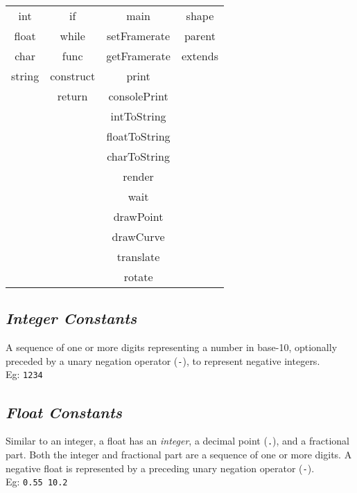         \begin{center}
            \begin{tabular}{ |c|c|c|c| } 
            \hline
                int     & if            & main          & shape   \\ 
                float   & while         & setFramerate  & parent  \\ 
                char    & func          & getFramerate  & extends \\
                string  & construct     & print         & \\
                        & return        & consolePrint  & \\
                        &               & intToString   & \\
                        &               & floatToString & \\
                        &               & charToString  & \\
                        &               & render        & \\
                        &               & wait          & \\
                        &               & drawPoint     & \\
                        &               & drawCurve     & \\
                        &               & translate     & \\
                        &               & rotate        & \\

            \hline
            \end{tabular}
        \end{center}

    \subsection{\textit{Integer Constants}}
    A sequence of one or more digits representing a number in base-10, optionally preceded by a unary negation operator (\texttt{-}), to represent negative integers.\\
    Eg: \texttt{1234}

    \subsection{\textit{Float Constants}}
    Similar to an integer, a float has an \textit{integer}, a decimal point (\texttt{.}), and a fractional part. Both the integer and fractional part are a sequence of one or more digits. A negative float is represented by a preceding unary negation operator (\texttt{-}).\\
    Eg: \texttt{0.55  10.2}

